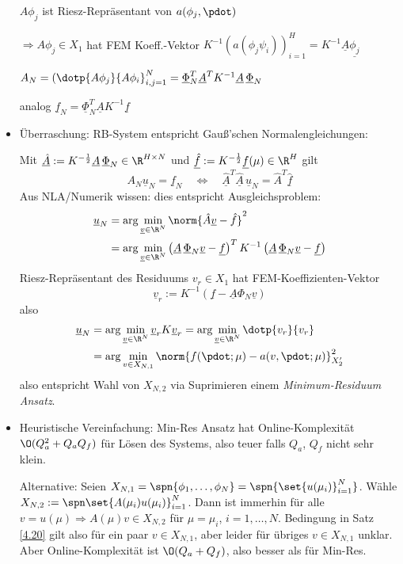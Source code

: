 \begin{bem}
\begin{itemize}
		$A\phi_j$ ist Riesz-Repräsentant von $a(\phi_j,\pdot)$
		
		$\Rightarrow A\phi_j \in X_1$ hat FEM Koeff.-Vektor $K^{-1} (a(\phi_j \psi_i))_{i=1}^H = K^{-1} \underline{A} \underline{\phi_j}$
		
		$A_N= (\dotp{A\phi_j}{A\phi_i}_{i,j=1}^N = \underline{\Phi}_N^T \underline{A}^T K^{-1} \underline{A} \, \underline{\Phi}_N$
		
		analog $\underline{f}_N = \underline{\Phi}_N^T \underline{A} K^{-1} \underline{f}$
		\item Überraschung: RB-System entspricht Gauß'schen Normalengleichungen:

			Mit $\underline{\hat A} := K^{-\frac{1}{2}} \underline{A} \, \underline{\Phi}_N \in \R^{H \times N}$ und $\underline{\hat f} := K^{-\frac{1}{2}} \underline{f}(\mu) \in \R^H$ gilt
			\[
				A_N \underline{u}_N = \underline{f}_N \quad \Leftrightarrow \quad \underline{\hat A}^T \underline{\hat A} \, \underline{u}_N = \hat A^T \underline{\hat f}
			\]
			Aus NLA/Numerik wissen: dies entspricht Ausgleichsproblem:
			\begin{align*}
				\underline{u}_N &= \arg \min_{\underline{v} \in \R^N} \norm{\hat A \underline{v} - \hat f}^2 \\
				&= \arg \min_{\underline{v} \in \R^N} \left( \underline{A} \, \underline{\Phi}_N \underline{v} - \underline{f} \right)^T K^{-1} \left( \underline{A} \, \underline{\Phi}_N \underline{v} - \underline{f} \right)
			\end{align*}
			Riesz-Repräsentant des Residuums $v_r \in X_1$ hat FEM-Koeffizienten-Vektor
			\[
				\underline{v}_r := K^{-1} \left( \underline{f} - \underline{A} \Phi_N \underline{v} \right)
			\]
			also
			\begin{align*}
				\underline{u}_N &= \arg\min_{\underline{v} \in \R^N} \underline{v}_r K \underline{v}_r = \arg\min_{\underline{v} \in \R^N} \dotp{v_r}{v_r}\\
				&= \arg\min_{v \in X_{N,1}} \norm{f(\pdot;\mu)-a(v,\pdot;\mu)}_{X_2'}^2
			\end{align*}
			also entspricht Wahl von $X_{N,2}$ via Suprimieren einem \emph{Minimum-Residuum Ansatz}.
		\item Heuristische Vereinfachung: Min-Res Ansatz hat Online-Komplexität $\O(Q_a^2 + Q_a Q_f)$ für Lösen des Systems, also teuer falls $Q_a$, $Q_f$ nicht sehr klein.

			Alternative: Seien $X_{N,1} = \spn{\phi_1,\ldots,\phi_N} = \spn{\set{u(\mu_i)}_{i=1}^N}$. Wähle $X_{N,2} := \spn\set{A(\mu_i) u(\mu_i)}_{i=1}^N$. Dann ist immerhin für alle $v = u(\mu) \Rightarrow A(\mu) v \in X_{N,2}$ für $\mu = \mu_i$, $i = 1,\ldots,N$. Bedingung in Satz \ref{4.20} gilt also für ein paar $v \in X_{N,1}$, aber leider für übriges $v \in X_{N,1}$ unklar. Aber Online-Komplexität ist $\O(Q_a+Q_f)$, also besser als für Min-Res.
		\end{itemize}
\end{bem}

